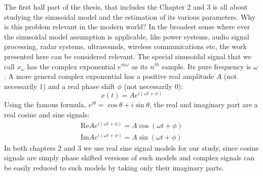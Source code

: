 \documentclass{UCF_ETD}
\begin{document}
The first half part of the thesis, that includes the Chapter 2 and 3 is all 
about studying the sinusoidal model and the estimation of its various parameters. Why is this problem relevant in the modern world? In the broadest sense where ever the sinusoidal model assumption is applicable, like power systems, audio signal processing, radar systems, ultrasounds, wireless communications etc, the work presented here can be considered relevant. The special sinusoidal signal that we call $x_{\omega}$ has the complex exponential $e^{in\omega}$ as its $n^{th}$ sample. Its pure frequency is $\omega$. A more general complex exponential has a positive real amplitude $A$ (not necessarily $1$) and a real phase shift $\phi$ (not necessarily $0$):
\begin{equation}
x(t) = A e^{i(\omega t+\phi)} 
\end{equation}
Using the famous formula, $e^{i\theta} = \cos \theta + i \sin \theta$, the real and imaginary part are a real cosine and sine signals:
\begin{eqnarray}
\text{Re}{Ae^{i(\omega t + \phi)}} = A \cos(\omega t+ \phi) \nonumber \\
\text{Im}{Ae^{i(\omega t + \phi)}} = A \sin(\omega t+ \phi) 
\end{eqnarray}   
In both chapters 2 and 3 we use real sine signal models for our study, since cosine signals are simply phase shifted versions of such models and complex signals can be easily reduced to such models by taking only their imaginary parts.
\end{document}

